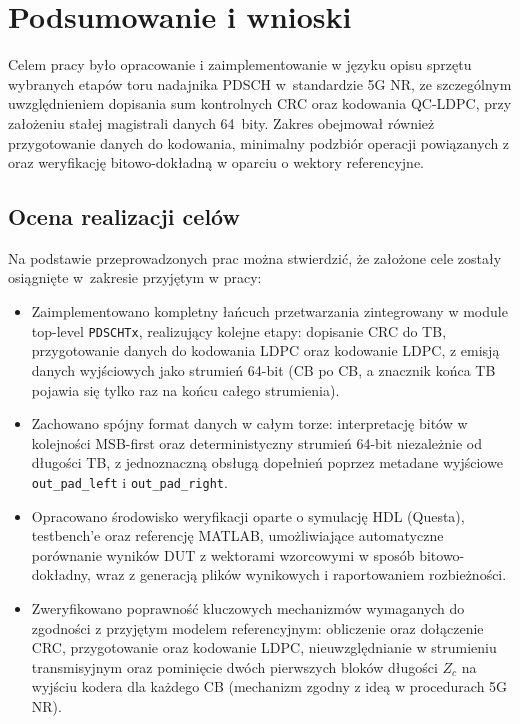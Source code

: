 \chapter{Podsumowanie i wnioski}

Celem pracy było opracowanie i zaimplementowanie w języku opisu sprzętu wybranych etapów toru nadajnika PDSCH w~standardzie 5G NR, ze szczególnym uwzględnieniem dopisania sum kontrolnych CRC oraz kodowania QC-LDPC, przy założeniu stałej magistrali danych 64~bity. Zakres obejmował również przygotowanie danych do kodowania, minimalny podzbiór operacji powiązanych z  oraz weryfikację bitowo-dokładną w oparciu o wektory referencyjne. 

\section*{Ocena realizacji celów}
Na podstawie przeprowadzonych prac można stwierdzić, że założone cele zostały osiągnięte w~zakresie przyjętym w pracy:

\begin{itemize}
  \item Zaimplementowano kompletny łańcuch przetwarzania zintegrowany w module top-level \texttt{PDSCHTx}, realizujący kolejne etapy: dopisanie CRC do TB, przygotowanie danych do kodowania LDPC oraz kodowanie LDPC, z emisją danych wyjściowych jako strumień 64-bit (CB po CB, a znacznik końca TB pojawia się tylko raz na końcu całego strumienia). 

  \item Zachowano spójny format danych w całym torze: interpretację bitów w kolejności MSB-first oraz deterministyczny strumień 64-bit niezależnie od długości TB, z jednoznaczną obsługą dopełnień poprzez metadane wyjściowe \texttt{out\_pad\_left} i \texttt{out\_pad\_right}. 

  \item Opracowano środowisko weryfikacji oparte o symulację HDL (Questa), testbench’e oraz referencję MATLAB, umożliwiające automatyczne porównanie wyników DUT z wektorami wzorcowymi w sposób bitowo-dokładny, wraz z generacją plików wynikowych i raportowaniem rozbieżności. 

  \item Zweryfikowano poprawność kluczowych mechanizmów wymaganych do zgodności z przyjętym modelem referencyjnym: obliczenie oraz dołączenie CRC, przygotowanie oraz kodowanie LDPC, nieuwzględnianie  w strumieniu transmisyjnym oraz pominięcie dwóch pierwszych bloków długości $Z_c$ na wyjściu kodera dla każdego CB (mechanizm zgodny z ideą  w procedurach 5G NR). 
\end{itemize}

